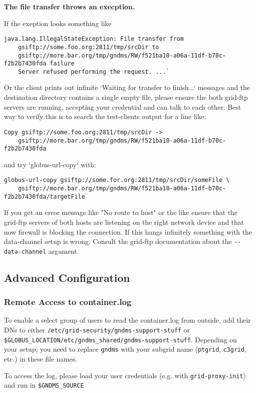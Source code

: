 \documentclass{article}
\begin{document}
\textbf{The file transfer throws an execption.}

 If the exeption looks something like
\begin{verbatim}
java.lang.IllegalStateException: File transfer from 
    gsiftp://some.foo.org:2811/tmp/srcDir to 
    gsiftp://more.bar.org/tmp/gndms/RW/f521ba10-a06a-11df-b70c-f2b2b7430fda failure 
    Server refused performing the request. ...`
\end{verbatim}
Or the client prints out infinite `Waiting for transfer to finish...`
messages and the destination directory contains a single empty file,
please ensure the both grid-ftp servers are running, accepting your
credential and can talk to each other. Best way to verify this is to
search the test-clients output for a line like:
 \begin{verbatim}
Copy gsiftp://some.foo.org:2811/tmp/srcDir ->
    gsiftp://more.bar.org/tmp/gndms/RW/f521ba10-a06a-11df-b70c-f2b2b7430fda
 \end{verbatim}
and try `globus-url-copy` with:
 \begin{verbatim}
globus-url-copy gsiftp://some.for.org:2811/tmp/srcDir/someFile \
    gsiftp://more.bar.org/tmp/gndms/RW/f521ba10-a06a-11df-b70c-f2b2b7430fda/targetFile
 \end{verbatim}
If you get an error message like "No route to host" or the like
ensure that the grid-ftp servers of both hosts are listening on the
right network device and that now firewall is blocking the connection.
If this hangs infinitely something with the data-channel setup is
wrong. Consult the grid-ftp documentation about the
\verb+--data-channel+ argument.

\subsection{Advanced Configuration}

\subsubsection{Remote Access to container.log}

To enable a select group of users to read the container.log from
outside, add their DNs to either
\verb!/etc/grid-security/gndms-support-stuff! or
\verb!$GLOBUS_LOCATION/etc/gndms_shared/gndms-support-stuff!.
Depending on your setup, you need to replace \verb!gndms! with your
subgrid name (\verb!ptgrid!, \verb!c3grid!, etc.) in these file
names.

To access the log, please load your user credentials (e.g. with
\verb!grid-proxy-init!) and run in \verb!$GNDMS_SOURCE!
\end{document}
